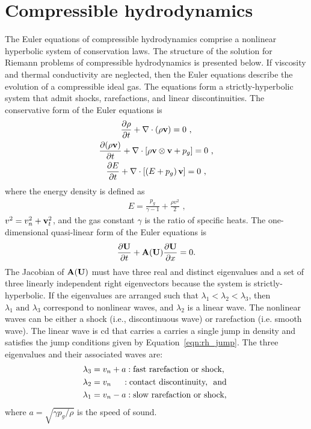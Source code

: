 \section[Compressible hydrodynamics]{Compressible hydrodynamics}
\label{sec:com_hydro}

The Euler equations of compressible hydrodynamics comprise a nonlinear hyperbolic system of conservation laws. The structure of the solution for Riemann problems of compressible hydrodynamics is presented below.  If viscosity and thermal conductivity are neglected, then the Euler equations describe the evolution of a compressible ideal gas.  The equations form a strictly-hyperbolic system that admit shocks, rarefactions, and linear discontinuities.  The conservative form of the Euler equations is
\begin{gather}
\label{eqn:euler1} \frac{\partial \rho}{\partial t} + \mathbf{\nabla} \cdot \left(\rho\mathbf{v}\right) = 0 \text{ ,} \\
\label{eqn:euler2} \frac{\partial (\rho \mathbf{v})}{\partial t} + \mathbf{\nabla} \cdot \left[ \rho\mathbf{v} \otimes \mathbf{v} + p_g \right]  = 0 \text{ ,}\\
\label{eqn:euler3} \frac{\partial E}{\partial t} + \mathbf{\nabla} \cdot \left[ \left(E + p_g \right)\mathbf{v}\right]  = 0 \text{ ,}
\end{gather}
where the energy density is defined as
\begin{gather}
  \label{eqn:energy} E = \frac{p_g}{\gamma - 1} + \frac{\rho v^2}{2}\text{ ,}
\end{gather}
$v^2 = v_n^2 + \mathbf{v}_{t}^2$, and the gas constant $\gamma$ is the ratio of specific heats.  The one-dimensional quasi-linear form of the Euler equations is 
\begin{gather}
\label{eqn:euler_qlin}
\frac{\partial \mathbf{U}}{\partial t} + \mathbf{A}(\mathbf{U})\frac{\partial \mathbf{U}}{\partial x} = 0.
\end{gather}
The Jacobian of $\mathbf{A}(\mathbf{U})$ must have three real and distinct eigenvalues and a set of three linearly independent right eigenvectors because the system is strictly-hyperbolic.  If the eigenvalues are arranged such that $\lambda_1 < \lambda_2 < \lambda_3$, then $\lambda_1  \text{ and } \lambda_3$ correspond to nonlinear waves, and $\lambda_2$ is a linear wave.  The nonlinear waves can be either a shock (i.e., discontinuous wave) or rarefaction (i.e. smooth wave).  The linear wave is \gls{cd} that carries a carries a single jump in density and satisfies the jump conditions given by Equation~\ref{eqn:rh_jump}.  The three eigenvalues and their associated waves are:
\begin{align*}
\lambda_3 &= v_n + a : \text{fast rarefaction or shock,} \\
\lambda_2 &= v_n \phantom{+ a} : \text{contact discontinuity, \text{ and }} \\
\lambda_1 &= v_n - a : \text{slow rarefaction or shock,} 
\end{align*}
where $a = \sqrt{\gamma p_g/\rho}$ is the speed of sound.  

